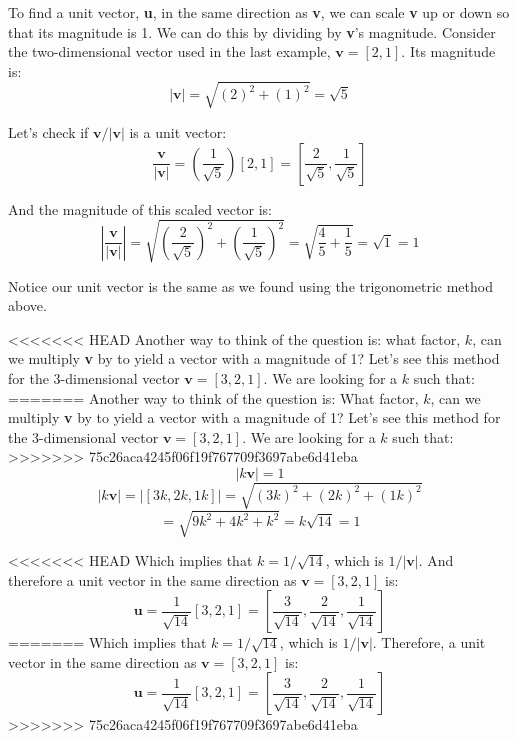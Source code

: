 To find a unit vector, \textbf{u}, in the same direction as \textbf{v}, we can 
scale \textbf{v} up or down so that its magnitude is 1. We can do this by 
dividing by \textbf{v}'s magnitude. Consider the two-dimensional vector used 
in the last example, $\textbf{v} = \left[ 2, 1 \right]$. Its magnitude is:
$$| \textbf{v} | = \sqrt{\left( 2 \right)^2 + \left( 1 \right)^2} = \sqrt{5}$$

Let's check if $\textbf{v} / | \textbf{v} |$ is a unit vector:
$$ \frac{\textbf{v}}{|\textbf{v}|} = \left( \frac{1}{\sqrt{5}} \right) \left[ 
2, 1 \right] = \left[ \frac{2}{\sqrt{5}}, \frac{1}{\sqrt{5}} \right]$$

And the magnitude of this scaled vector is:
$$ \left| \frac{\textbf{v}}{| \textbf{v} |} \right| = \sqrt{\left( \frac{2}{
\sqrt{5}} \right)^2 + \left( \frac{1}{\sqrt{5}} \right)^2} = \sqrt{\frac{4}{5} 
+ \frac{1}{5}} = \sqrt{1} = 1$$

Notice our unit vector is the same as we found using the trigonometric method 
above. 

<<<<<<< HEAD
Another way to think of the question is: what factor, $k$, can we multiply 
\textbf{v} by to yield a vector with a magnitude of 1? Let's see this method 
for the 3-dimensional vector $\textbf{v} = \left[ 3, 2, 1 \right]$. We are 
looking for a $k$ such that:
=======
Another way to think of the question is: What factor, $k$, can we multiply \textbf{v} by to yield a vector with a magnitude of 1? Let's see this method for the 3-dimensional vector $\textbf{v} = \left[ 3, 2, 1 \right]$. We are looking for a $k$ such that:
>>>>>>> 75c26aca4245f06f19f767709f3697abe6d41eba
$$|k\textbf{v}| = 1$$
$$|k \textbf{v}| = \left| \left[ 3k, 2k, 1k \right] \right| = \sqrt{\left( 3k 
\right)^2 + \left( 2k \right)^2 + \left( 1k \right)^2}$$
$$= \sqrt{9k^2 + 4k^2 + k^2} = k\sqrt{14} = 1$$

<<<<<<< HEAD
Which implies that $k = 1/\sqrt{14}$, which is $1/|\textbf{v}|$. And therefore 
a unit vector in the same direction as $\textbf{v} = \left[ 3, 2, 1 \right]$ 
is:
$$\textbf{u} = \frac{1}{\sqrt{14}} \left[ 3, 2, 1 \right] = \left[ \frac{3}{
\sqrt{14}}, \frac{2}{\sqrt{14}}, \frac{1}{\sqrt{14}} \right]$$
=======
Which implies that $k = 1/\sqrt{14}$, which is $1/|\textbf{v}|$. Therefore, a unit vector in the same direction as $\textbf{v} = \left[ 3, 2, 1 \right]$ is:
$$\textbf{u} = \frac{1}{\sqrt{14}} \left[ 3, 2, 1 \right] = \left[ \frac{3}{\sqrt{14}}, \frac{2}{\sqrt{14}}, \frac{1}{\sqrt{14}} \right]$$
>>>>>>> 75c26aca4245f06f19f767709f3697abe6d41eba


